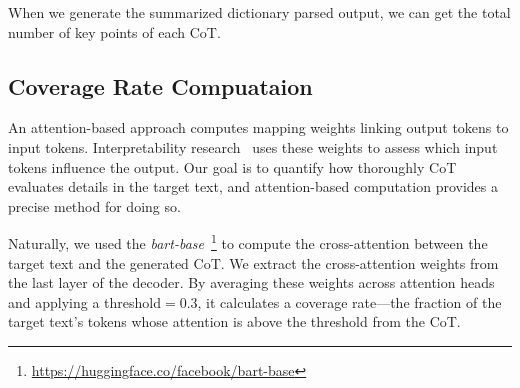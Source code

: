 When we generate the summarized dictionary parsed output, we can get the total number of key points of each CoT.

\subsection{Coverage Rate Compuataion}
\label{subsec:coverage_appendix}
An attention-based approach computes mapping weights linking output tokens to input tokens. Interpretability research~\citep{bibal2022attention,vig2019multiscale} uses these weights to assess which input tokens influence the output. Our goal is to quantify how thoroughly CoT evaluates details in the target text, and attention-based computation provides a precise method for doing so.

Naturally, we used the \textit{bart-base}~\footnote{\url{https://huggingface.co/facebook/bart-base}} to compute the cross-attention between the target text and the generated CoT. We extract the cross-attention weights from the last layer of the decoder. By averaging these weights across attention heads and applying a threshold$=0.3$, it calculates a coverage rate—the fraction of the target text’s tokens whose attention is above the threshold from the CoT.

